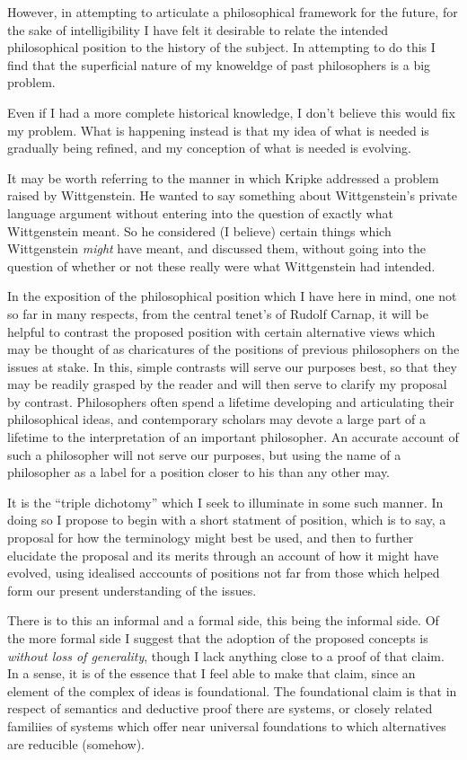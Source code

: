 \documentclass[10pt,titlepage]{article}
\begin{document}
However, in attempting to articulate a philosophical framework for the future, for the sake of intelligibility I have felt it desirable to relate the intended philosophical position to the history of the subject.
In attempting to do this I find that the superficial nature of my knoweldge of past philosophers is a big problem.

Even if I had a more complete historical knowledge, I don't believe this would fix my problem.
What is happening instead is that my idea of what is needed is gradually being refined, and my conception of what is needed is evolving.

It may be worth referring to the manner in which Kripke addressed a problem raised by Wittgenstein.
He wanted to say something about Wittgenstein's private language argument without entering into the
question of exactly what Wittgenstein meant.
So he considered (I believe) certain things which Wittgenstein \emph{might} have meant, and discussed them, without going into the question of whether or not these really were what Wittgenstein had intended.

In the exposition of the philosophical position which I have here in mind, one not so far in many respects, from the central tenet's of Rudolf Carnap, it will be helpful to contrast the proposed position with certain alternative views which may be thought of as charicatures of the positions of previous philosophers on the issues at stake.
In this, simple contrasts will serve our purposes best, so that they may be readily grasped by the reader and will then serve to clarify my proposal by contrast.
Philosophers often spend a lifetime developing and articulating their philosophical ideas, and contemporary scholars may devote a large part of a lifetime to the interpretation of an important philosopher.
An accurate account of such a philosopher will not serve our purposes, but using the name of a philosopher as a label for a position closer to his than any other may.

It is the ``triple dichotomy'' which I seek to illuminate in some such manner.
In doing so I propose to begin with a short statment of position, which is to say, a proposal for how the terminology might best be used, and then to further elucidate the proposal and its merits through an account of how it might have evolved, using idealised acccounts of positions not far from those which helped form our present understanding of the issues.

There is to this an informal and a formal side, this being the informal side.
Of the more formal side I suggest that the adoption of the proposed concepts is \emph{without loss of generality}, though I lack anything close to a proof of that claim.
In a sense, it is of the essence that I feel able to make that claim, since an element of the complex of ideas is foundational.
The foundational claim is that in respect of semantics and deductive proof there are systems, or closely related familiies of systems which offer near universal foundations to which alternatives are reducible (somehow).
\end{document}
